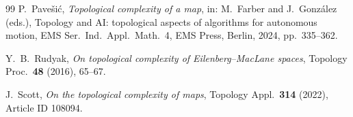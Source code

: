 \documentclass[11pt]{amsart}
\theoremstyle{plain}
\theoremstyle{definition}
\begin{document}
\begin{thebibliography}{99}
P.~Pave\v si\'c, \emph{Topological complexity of a map},
in: M.~Farber and J.~Gonz\'alez (eds.), Topology and AI: topological aspects
of algorithms for autonomous motion,
EMS Ser.\ Ind.\ Appl.\ Math.\ 4, EMS Press, Berlin, 2024, pp.~335--362.

Y.~B.~Rudyak,
\emph{On topological complexity of Eilenberg--MacLane spaces},
Topology Proc.\ \textbf{48} (2016), 65--67.

J.~Scott, \emph{On the topological complexity of maps},
Topology Appl.\ \textbf{314} (2022), Article ID 108094.

\end{thebibliography}
\end{document}
